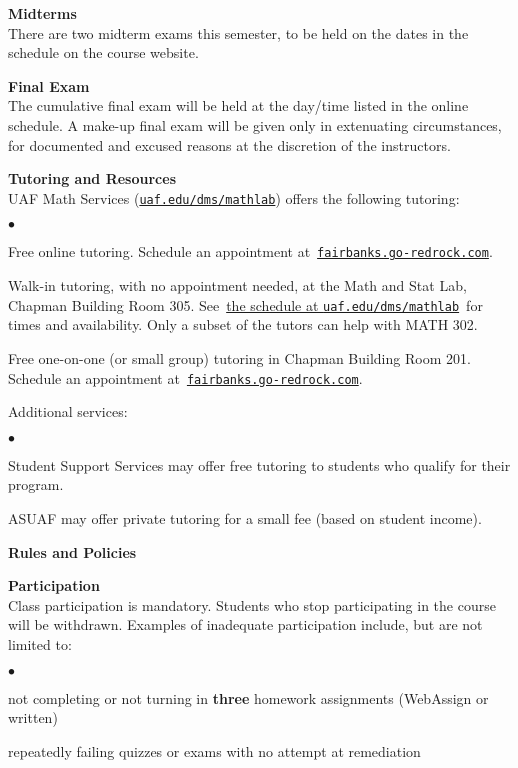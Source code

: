 \documentclass[12pt]{article}
\renewcommand{\emph}[1]{\textsf{\textbf{#1}}}
\newcommand{\localhead}[1]{\par\smallskip\textbf{#1}\nobreak\\}%
\def\heading#1{\localhead{\large\emph{#1}}}
\def\subheading#1{\localhead{\emph{#1}}}
\newenvironment{clist}%
{\bgroup\parskip 0pt\begin{list}{$\bullet$}{\partopsep 4pt\topsep 0pt\itemsep -2pt}}%
{\end{list}\egroup}%
\begin{document}
\heading{Midterms}
There are two midterm exams this semester, to be held on the dates in the schedule on the course website.


\heading{Final Exam}
The cumulative final exam will be held at the day/time listed in the online schedule. A make-up final exam will be given only in extenuating circumstances, for documented and excused reasons at the discretion of the instructors.


\heading{Tutoring and Resources}
UAF Math Services (\href{http://www.uaf.edu/dms/mathlab/}{\texttt{uaf.edu/dms/mathlab}}) offers the following tutoring:
\begin{clist}
	\item Free online tutoring.  Schedule an appointment at\, \href{https://fairbanks.go-redrock.com/}{\texttt{fairbanks.go-redrock.com}}.
	\item Walk-in tutoring, with no appointment needed, at the Math and Stat Lab, Chapman Building Room 305.  See\, \href{https://uaf.edu/dms/mathlab/math-and-stat-lab-schedul-1/}{the schedule at \texttt{uaf.edu/dms/mathlab}}\, for times and availability.  Only a subset of the tutors can help with MATH 302.
	\item Free one-on-one (or small group) tutoring in Chapman Building Room 201.  Schedule an appointment at\, \href{https://fairbanks.go-redrock.com/}{\texttt{fairbanks.go-redrock.com}}.
\end{clist}

Additional services:
\begin{clist}
	\item Student Support Services may offer free tutoring to students who qualify for their program.
	\item ASUAF may offer private tutoring for a small fee (based on student income).
\end{clist}


\newpage
\strut

\heading{Rules and Policies}
\vskip -20pt
\subheading{Participation}
Class participation is mandatory.  Students who stop participating in the course will be withdrawn.  Examples of inadequate participation include, but are not limited to:

\begin{clist}
\item not completing or not turning in \textbf{three} homework assignments (WebAssign or written)
\item repeatedly failing quizzes or exams with no attempt at remediation
\end{clist}
\end{document}
